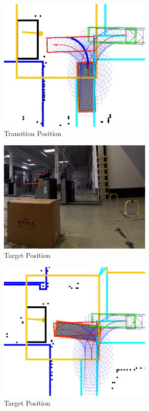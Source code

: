 \begin{figure}[H]
    \begin{center}
        \includegraphics[width=3in]{images/Chap3/Test3/Transition_simu.png} %
        \caption{Transition Position}
        \label{OptResult21}
        \end{center}    
\end{figure}

\begin{figure}[H]
    \begin{center}
        \includegraphics[width=3in]{images/Chap3/Test3/Target_Real.png} %
        \caption{Target Position}
        \label{OptResult22}
        \end{center}    
\end{figure}

\begin{figure}[H]
    \begin{center}
        \includegraphics[width=3in]{images/Chap3/Test3/Target_simu.png} %
        \caption{Target Position}
        \label{OptResult23}
        \end{center}    
\end{figure}



